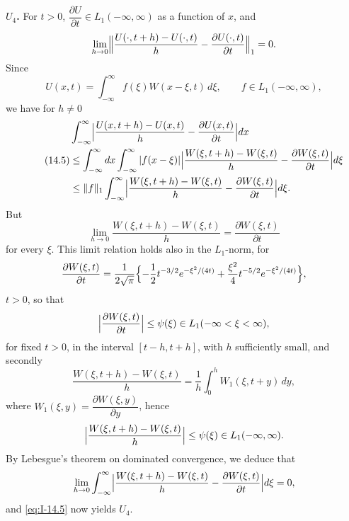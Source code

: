\noindent\textbf{$U_4$.} For $t>0$, $\dfrac{\partial U}{\partial t}\in L_1(-\infty,\infty)$ as a function of $x$, and
\begin{equation*}
\lim_{h\to 0}\Bigl\|\frac{U(\cdot,t+h)-U(\cdot,t)}{h}-\frac{\partial U(\cdot,t)}{\partial t}\Bigr\|_1=0.
\end{equation*}
Since
\begin{equation*}
U(x,t)=\int_{-\infty}^{\infty}f(\xi)W(x-\xi,t)\,d\xi,\qquad f\in L_1(-\infty,\infty),
\end{equation*}
we have for $h\neq 0$
\begin{equation}\label{eq:I-14.5}\tag{14.5}
\begin{aligned}
&\int_{-\infty}^{\infty}\Bigl|\frac{U(x,t+h)-U(x,t)}{h}-\frac{\partial U(x,t)}{\partial t}\Bigr|dx\\
&\le\int_{-\infty}^{\infty}dx\int_{-\infty}^{\infty}|f(x-\xi)|\Bigl|\frac{W(\xi,t+h)-W(\xi,t)}{h}-\frac{\partial W(\xi,t)}{\partial t}\Bigr|d\xi\\
&\le\|f\|_1\int_{-\infty}^{\infty}\Bigl|\frac{W(\xi,t+h)-W(\xi,t)}{h}-\frac{\partial W(\xi,t)}{\partial t}\Bigr|d\xi.
\end{aligned}
\end{equation}
But
\begin{equation*}
\lim_{h\to 0}\frac{W(\xi,t+h)-W(\xi,t)}{h}=\frac{\partial W(\xi,t)}{\partial t}
\end{equation*}
for every $\xi$. This limit relation holds also in the $L_1$-norm, for
\begin{equation*}
\frac{\partial W(\xi,t)}{\partial t}
=\frac{1}{2\sqrt{\pi}}\Bigl\{-\frac12t^{-3/2}e^{-\xi^{2}/(4t)}+\frac{\xi^{2}}{4}t^{-5/2}e^{-\xi^{2}/(4t)}\Bigr\},
\end{equation*}
$t>0$, so that
\begin{equation*}
\Bigl|\frac{\partial W(\xi,t)}{\partial t}\Bigr|\le\psi(\xi)\in L_1(-\infty<\xi<\infty),
\end{equation*}
for fixed $t>0$, in the interval $[t-h,t+h]$, with $h$ sufficiently small, and secondly
\begin{equation*}
\frac{W(\xi,t+h)-W(\xi,t)}{h}=\frac{1}{h}\int_{0}^{h}W_1(\xi,t+y)\,dy,
\end{equation*}
where $W_1(\xi,y)=\dfrac{\partial W(\xi,y)}{\partial y}$, hence
\begin{equation*}
\Bigl|\frac{W(\xi,t+h)-W(\xi,t)}{h}\Bigr|\le\psi(\xi)\in L_1(-\infty,\infty).
\end{equation*}
By Lebesgue's theorem on dominated convergence, we deduce that
\begin{equation*}
\lim_{h\to 0}\int_{-\infty}^{\infty}\Bigl|\frac{W(\xi,t+h)-W(\xi,t)}{h}-\frac{\partial W(\xi,t)}{\partial t}\Bigr|d\xi=0,
\end{equation*}
and \eqref{eq:I-14.5} now yields $U_4$.

